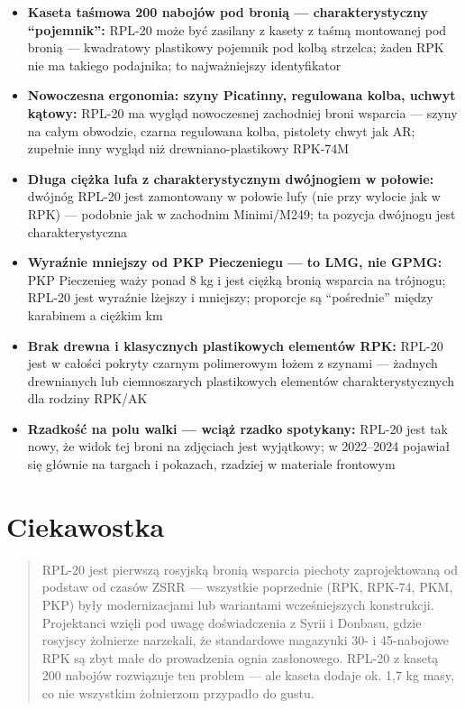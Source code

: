 \documentclass[12pt,openany,oneside]{book}
\providecommand{\tightlist}{%
  \setlength{\itemsep}{0pt}\setlength{\parskip}{0pt}}
\begin{document}
\begin{itemize}
\tightlist
\item
  \textbf{Kaseta taśmowa 200 nabojów pod bronią --- charakterystyczny
  ``pojemnik'':} RPL-20 może być zasilany z kasety z taśmą montowanej
  pod bronią --- kwadratowy plastikowy pojemnik pod kolbą strzelca;
  żaden RPK nie ma takiego podajnika; to najważniejszy identyfikator
\item
  \textbf{Nowoczesna ergonomia: szyny Picatinny, regulowana kolba,
  uchwyt kątowy:} RPL-20 ma wygląd nowoczesnej zachodniej broni wsparcia
  --- szyny na całym obwodzie, czarna regulowana kolba, pistolety chwyt
  jak AR; zupełnie inny wygląd niż drewniano-plastikowy RPK-74M
\item
  \textbf{Długa ciężka lufa z charakterystycznym dwójnogiem w połowie:}
  dwójnóg RPL-20 jest zamontowany w połowie lufy (nie przy wylocie jak w
  RPK) --- podobnie jak w zachodnim Minimi/M249; ta pozycja dwójnogu
  jest charakterystyczna
\item
  \textbf{Wyraźnie mniejszy od PKP Pieczeniegu --- to LMG, nie GPMG:}
  PKP Pieczenieg waży ponad 8 kg i jest ciężką bronią wsparcia na
  trójnogu; RPL-20 jest wyraźnie lżejszy i mniejszy; proporcje są
  ``pośrednie'' między karabinem a ciężkim km
\item
  \textbf{Brak drewna i klasycznych plastikowych elementów RPK:} RPL-20
  jest w całości pokryty czarnym polimerowym łożem z szynami --- żadnych
  drewnianych lub ciemnoszarych plastikowych elementów
  charakterystycznych dla rodziny RPK/AK
\item
  \textbf{Rzadkość na polu walki --- wciąż rzadko spotykany:} RPL-20
  jest tak nowy, że widok tej broni na zdjęciach jest wyjątkowy; w
  2022--2024 pojawiał się głównie na targach i pokazach, rzadziej w
  materiale frontowym
\end{itemize}

\section{Ciekawostka}\label{ciekawostka-55}

\begin{quote}
RPL-20 jest pierwszą rosyjską bronią wsparcia piechoty zaprojektowaną od
podstaw od czasów ZSRR --- wszystkie poprzednie (RPK, RPK-74, PKM, PKP)
były modernizacjami lub wariantami wcześniejszych konstrukcji.
Projektanci wzięli pod uwagę doświadczenia z Syrii i Donbasu, gdzie
rosyjscy żołnierze narzekali, że standardowe magazynki 30- i 45-nabojowe
RPK są zbyt małe do prowadzenia ognia zasłonowego. RPL-20 z kasetą 200
nabojów rozwiązuje ten problem --- ale kaseta dodaje ok. 1,7 kg masy, co
nie wszystkim żołnierzom przypadło do gustu.
\end{quote}
\end{document}
